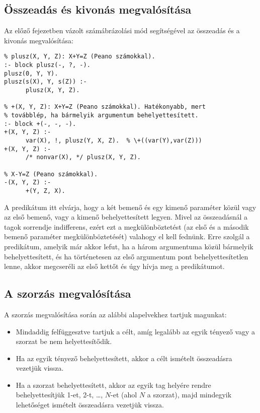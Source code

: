 \subsection{Összeadás és kivonás megvalósítása}

Az előző fejezetben vázolt számábrázolási mód segítségével az összeadás
és a kivonás megvalósítása:

\begin{verbatim}
% plusz(X, Y, Z): X+Y=Z (Peano számokkal).
:- block plusz(-, ?, -).
plusz(0, Y, Y).
plusz(s(X), Y, s(Z)) :-
      plusz(X, Y, Z).

% +(X, Y, Z): X+Y=Z (Peano számokkal). Hatékonyabb, mert
% továbblép, ha bármelyik argumentum behelyettesített.
:- block +(-, -, -).
+(X, Y, Z) :- 
      var(X), !, plusz(Y, X, Z).  % \+((var(Y),var(Z)))
+(X, Y, Z) :-
      /* nonvar(X), */ plusz(X, Y, Z).

% X-Y=Z (Peano számokkal).
-(X, Y, Z) :-
      +(Y, Z, X).
\end{verbatim}

A  predikátum itt elvárja, hogy a két bemenő és egy kimenő
paraméter közül vagy az első bemenő, vagy a kimenő behelyettesített legyen.
Mivel az összeadásnál a tagok sorrendje indifferens, ezért ezt a
megkülönböztetést (az első és a második bemenő paraméter megkülönböztetését)
valahogy el kell fednünk. Erre szolgál a  predikátum, amelyik
már akkor lefut, ha a három argumentuma közül bármelyik behelyettesített,
és ha történetesen az első argumentum pont behelyettesítetlen lenne, akkor
megcseréli az első kettőt és úgy hívja meg a  predikátumot.

\subsection{A szorzás megvalósítása}

A szorzás megvalósítása során az alábbi alapelvekhez tartjuk magunkat:

\begin{itemize}
\item Mindaddig felfüggesztve tartjuk a célt, amíg legalább az egyik tényező
vagy a szorzat be nem helyettesítődik.
\item Ha az egyik tényező behelyettesített, akkor a célt ismételt összeadásra
vezetjük vissza.
\item Ha a szorzat behelyettesített, akkor az egyik tag helyére rendre
behelyettesítjük 1-et, 2-t, \ldots, $N$-et (ahol $N$ a szorzat), majd mindegyik
lehetőséget ismételt összeadásra vezetjük vissza.
\end{itemize}

